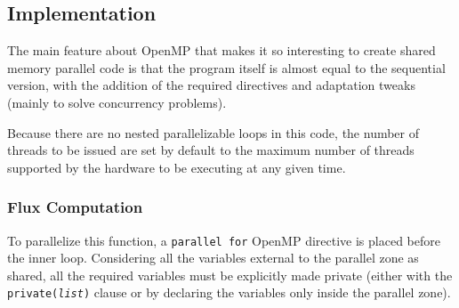 \documentclass[9pt,twocolumn]{scrartcl}
\newcommand{\paragraphh}[1]{\paragraph{#1\hfill}\hfill

}
\begin{document}
\subsection{Implementation}
The main feature about OpenMP that makes it so interesting to create shared memory parallel code is that the program itself is almost equal to the sequential version, with the addition of the required directives and adaptation tweaks (mainly to solve concurrency problems).

Because there are no nested parallelizable loops in this code, the number of threads to be issued are set by default to the maximum number of threads supported by the hardware to be executing at any given time. %

\subsubsection{Flux Computation}

To parallelize this function, a \texttt{parallel for} OpenMP directive is placed before the inner loop. Considering all the variables external to the parallel zone as shared, all the required variables must be explicitly made private (either with the \texttt{private({\textit{list}})} clause or by declaring the variables only inside the parallel zone).

%
\end{document}

